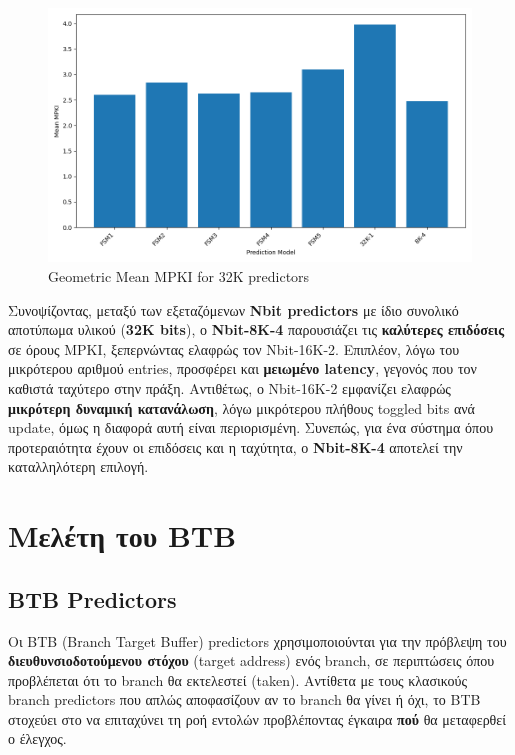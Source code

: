 \documentclass{article}
\begin{document}
\pagebreak

\begin{figure}[H]
    \centering
    \includegraphics[width=1\textwidth]{figures/5_3_c/geom_mean.png}
    \caption{Geometric Mean MPKI for 32K predictors}
    \label{fig:mean_mpkis_32K}
\end{figure}

Συνοψίζοντας, μεταξύ των εξεταζόμενων \textbf{Nbit predictors} με ίδιο συνολικό αποτύπωμα υλικού (\textbf{32K bits}), ο \textbf{Nbit-8K-4} παρουσιάζει τις \textbf{καλύτερες επιδόσεις} σε όρους MPKI, ξεπερνώντας ελαφρώς τον Nbit-16K-2. Επιπλέον, λόγω του μικρότερου αριθμού entries, προσφέρει και \textbf{μειωμένο latency}, γεγονός που τον καθιστά ταχύτερο στην πράξη. Αντιθέτως, ο Nbit-16K-2 εμφανίζει ελαφρώς \textbf{μικρότερη δυναμική κατανάλωση}, λόγω μικρότερου πλήθους toggled bits ανά update, όμως η διαφορά αυτή είναι περιορισμένη. Συνεπώς, για ένα σύστημα όπου προτεραιότητα έχουν οι επιδόσεις και η ταχύτητα, ο \textbf{Nbit-8K-4} αποτελεί την καταλληλότερη επιλογή.

\section{Μελέτη του ΒΤΒ}
\subsection*{BTB Predictors}

Οι BTB (Branch Target Buffer) predictors χρησιμοποιούνται για την πρόβλεψη του \textbf{διευθυνσιοδοτούμενου στόχου} (target address) ενός branch, σε περιπτώσεις όπου προβλέπεται ότι το branch θα εκτελεστεί (taken). Αντίθετα με τους κλασικούς branch predictors που απλώς αποφασίζουν αν το branch θα γίνει ή όχι, το BTB στοχεύει στο να επιταχύνει τη ροή εντολών προβλέποντας έγκαιρα \textbf{πού} θα μεταφερθεί ο έλεγχος.
\end{document}

